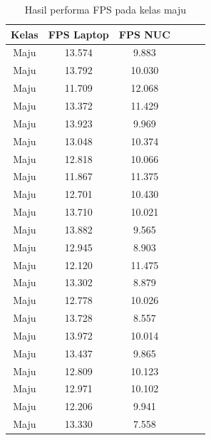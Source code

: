 \begin{longtable}{|c|c|c|c|c|c|}
  \caption{Hasil performa FPS pada kelas maju}
  \label{tb:fpsmaju} \\
  \hline
  \rowcolor[HTML]{C0C0C0} 
  \textbf{Kelas} & \textbf{FPS Laptop} & \textbf{FPS NUC} \\ \hline
  Maju           & 13.574              & 9.883            \\ \hline
  Maju           & 13.792              & 10.030           \\ \hline
  Maju           & 11.709              & 12.068           \\ \hline
  Maju           & 13.372              & 11.429           \\ \hline
  Maju           & 13.923              & 9.969            \\ \hline
  Maju           & 13.048              & 10.374           \\ \hline
  Maju           & 12.818              & 10.066           \\ \hline
  Maju           & 11.867              & 11.375           \\ \hline
  Maju           & 12.701              & 10.430           \\ \hline
  Maju           & 13.710              & 10.021           \\ \hline
  Maju           & 13.882              & 9.565            \\ \hline
  Maju           & 12.945              & 8.903            \\ \hline
  Maju           & 12.120              & 11.475           \\ \hline
  Maju           & 13.302              & 8.879            \\ \hline
  Maju           & 12.778              & 10.026           \\ \hline
  Maju           & 13.728              & 8.557            \\ \hline
  Maju           & 13.972              & 10.014           \\ \hline
  Maju           & 13.437              & 9.865            \\ \hline
  Maju           & 12.809              & 10.123           \\ \hline
  Maju           & 12.971              & 10.102           \\ \hline
  Maju           & 12.206              & 9.941            \\ \hline
  Maju           & 13.330              & 7.558            \\ \hline

\end{longtable}
